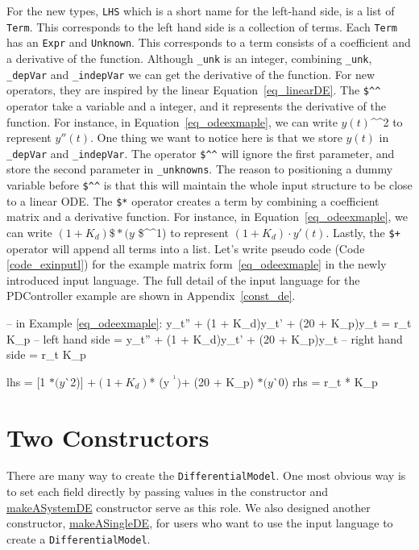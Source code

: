 For the new types, \verb|LHS| which is a short name for the left-hand side, is a list of \verb|Term|. This corresponds to the left hand side is a collection of terms. Each \verb|Term| has an \verb|Expr| and \verb|Unknown|. This corresponds to a term consists of a coefficient and a derivative of the function. Although \verb|_unk| is an integer, combining \verb|_unk|, \verb|_depVar| and \verb|_indepVar| we can get the derivative of the function. For new operators, they are inspired by the linear Equation~\ref{eq_linearDE}. The \verb|$^^| operator take a variable and a integer, and it represents the derivative of the function. For instance, in Equation~\ref{eq_odeexmaple}, we can write $y(t)$\^{}\^{}2 to represent $y''(t)$. One thing we want to notice here is that we store $y(t)$ in \verb|_depVar| and \verb|_indepVar|. The operator \verb|$^^| will ignore the first parameter, and store the second parameter in \verb|_unknowns|. The reason to positioning a dummy variable before \verb|$^^| is that this will maintain the whole input structure to be close to a linear ODE. The \verb|$*| operator creates a term by combining a coefficient matrix and a derivative function. For instance, in Equation~\ref{eq_odeexmaple}, we can write $(1 + K_d) \$* (y$ \$\^{}\^{}1) to represent $(1 + K_d) \cdot y'(t)$. Lastly, the \verb|$+| operator will append all terms into a list. Let's write pseudo code (Code \ref{code_exinputl}) for the example matrix form~\ref{eq_odeexmaple} in the newly introduced input language. The full detail of the input language for the PDController example are shown in Appendix~\ref{const_de}.

\begin{listing}[ht]
\begin{haskell1}
-- in Example \ref{eq_odeexmaple}: y\_t'' + (1 + K\_d)y\_t' + (20 + K\_p)y\_t = r\_t K\_p
-- left hand side = y\_t'' + (1 + K\_d)y\_t' + (20 + K\_p)y\_t 
-- right hand side = r\_t K\_p

lhs = [1 $* (y $^^ 2)]
	$+ (1 + K_d) $* (y $^^ 1)
	$+ (20 + K_p) $* (y $^^ 0)
rhs = r_t * K_p
\end{haskell1}
\label{code_exinputl}
\end{listing}

\section{Two Constructors}
There are many way to create the \verb|DifferentialModel|. One most obvious way is to set each field directly by passing values in the constructor and \href{https://jacquescarette.github.io/Drasil/docs/full/drasil-lang-0.1.60.0/Language-Drasil-Chunk-DifferentialModel.html#t:makeASystemDE}{makeASystemDE} constructor serve as this role. We also designed another constructor, \href{https://jacquescarette.github.io/Drasil/docs/full/drasil-lang-0.1.60.0/Language-Drasil-Chunk-DifferentialModel.html#t:makeASingleDE}{makeASingleDE}, for users who want to use the input language to create a \verb|DifferentialModel|.

